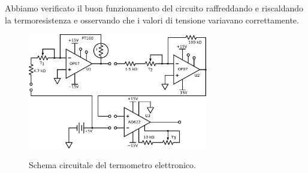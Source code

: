 Abbiamo verificato il buon funzionamento del circuito raffreddando e riscaldando la termoresistenza e osservando che i valori di tensione variavano correttamente.

\begin{figure}[ht]
 \centering
   {\includegraphics[width=0.7\textwidth]{../E06/latex/c1.pdf}}
 \caption{Schema circuitale del termometro elettronico.}
 \label{cir6:term}
\end{figure}
